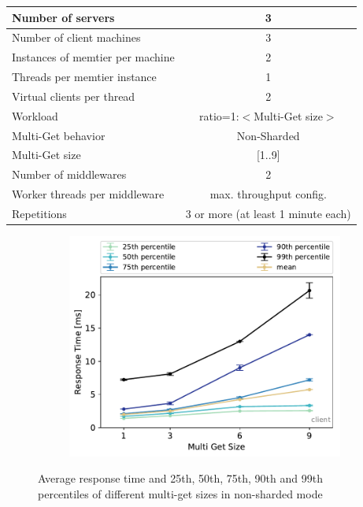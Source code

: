 \documentclass[11pt,a4paper]{article}
\begin{document}
\begin{center}
	\scriptsize{
		\begin{tabular}{|l|c|}
			\hline Number of servers                & 3                       \\ 
			\hline Number of client machines        & 3                       \\ 
			\hline Instances of memtier per machine & 2                       \\ 
			\hline Threads per memtier instance     & 1                       \\
			\hline Virtual clients per thread       & 2                		 \\ 
			\hline Workload                         & ratio=1:$<$Multi-Get size$>$              \\
			\hline Multi-Get behavior               & Non-Sharded             \\
			\hline Multi-Get size                   & [1..9]                  \\
			\hline Number of middlewares            & 2                       \\
			\hline Worker threads per middleware    & max. throughput config. \\
			\hline Repetitions                      & 3 or more (at least 1 minute each)               \\ 
			\hline 
		\end{tabular}
	} 
\end{center}

\begin{figure}
	\begin{subfigure}[b]{.49\linewidth}
		\centering
		\includegraphics[width=\linewidth]{data/exp52_nonsharded_rt_mget_perc_client.pdf}
	\end{subfigure}\hfill
	\begin{subfigure}[b]{.49\linewidth}
		
	\end{subfigure}%
	\caption{Average response time and 25th, 50th, 75th, 90th and 99th percentiles of different multi-get sizes in non-sharded mode}
\end{figure}
\end{document}
